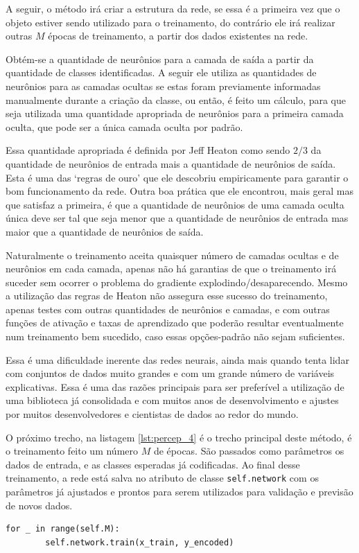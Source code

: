 A seguir, o método irá criar a estrutura da rede, se essa é a primeira vez que o objeto estiver sendo utilizado para o treinamento, do contrário ele irá realizar outras $M$ épocas de treinamento, a partir dos dados existentes na rede. 

Obtém-se a quantidade de neurônios para a camada de saída a partir da quantidade de classes identificadas. A seguir ele utiliza as quantidades de neurônios para as camadas ocultas se estas foram previamente informadas manualmente durante a criação da classe, ou então, é feito um cálculo, para que seja utilizada uma quantidade apropriada de neurônios para a primeira camada oculta, que pode ser a única camada oculta por padrão.

Essa quantidade apropriada é definida por Jeff Heaton \citep{layers_2} como sendo $2/3$ da quantidade de neurônios de entrada mais a quantidade de neurônios de saída. Esta é uma das `regras de ouro' que ele descobriu empiricamente para garantir o bom funcionamento da rede. Outra boa prática que ele encontrou, mais geral mas que satisfaz a primeira, é que a quantidade de neurônios de uma camada oculta única deve ser tal que seja menor que a quantidade de neurônios de entrada mas maior que a quantidade de neurônios de saída.

Naturalmente o treinamento aceita quaisquer número de camadas ocultas e de neurônios em cada camada, apenas não há garantias de que o treinamento irá suceder sem ocorrer o problema do gradiente explodindo/desaparecendo. Mesmo a utilização das regras de Heaton \citep{layers_2} não assegura esse sucesso do treinamento, apenas testes com outras quantidades de neurônios e camadas, e com outras funções de ativação e taxas de aprendizado que poderão resultar eventualmente num treinamento bem sucedido, caso essas opções-padrão não sejam suficientes.

Essa é uma dificuldade inerente das redes neurais, ainda mais quando tenta lidar com conjuntos de dados muito grandes e com um grande número de variáveis explicativas. Essa é uma das razões principais para ser preferível a utilização de uma biblioteca já consolidada e com muitos anos de desenvolvimento e ajustes por muitos desenvolvedores e cientistas de dados ao redor do mundo.

O próximo trecho, na listagem \ref{lst:percep_4} é o trecho principal deste método, é o treinamento  feito um número $M$ de épocas. São passados como parâmetros os dados de entrada, e as classes esperadas já codificadas. Ao final desse treinamento, a rede está salva no atributo de classe \texttt{self.network} com os parâmetros já ajustados e prontos para serem utilizados para validação e previsão de novos dados.
\newline
\estiloR
\begin{lstlisting}[caption={Trecho da classe \eng{Perceptron}}, label={lst:percep_4}, escapeinside={\%}]
    for _ in range(self.M):
        self.network.train(x_train, y_encoded)
\end{lstlisting}


